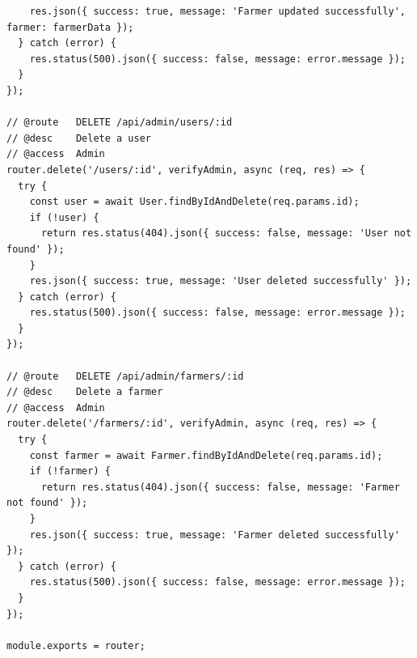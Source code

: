 \documentclass[12pt,a4paper]{report}
\begin{document}
\begin{lstlisting}
    res.json({ success: true, message: 'Farmer updated successfully', farmer: farmerData });
  } catch (error) {
    res.status(500).json({ success: false, message: error.message });
  }
});

// @route   DELETE /api/admin/users/:id
// @desc    Delete a user
// @access  Admin
router.delete('/users/:id', verifyAdmin, async (req, res) => {
  try {
    const user = await User.findByIdAndDelete(req.params.id);
    if (!user) {
      return res.status(404).json({ success: false, message: 'User not found' });
    }
    res.json({ success: true, message: 'User deleted successfully' });
  } catch (error) {
    res.status(500).json({ success: false, message: error.message });
  }
});

// @route   DELETE /api/admin/farmers/:id
// @desc    Delete a farmer
// @access  Admin
router.delete('/farmers/:id', verifyAdmin, async (req, res) => {
  try {
    const farmer = await Farmer.findByIdAndDelete(req.params.id);
    if (!farmer) {
      return res.status(404).json({ success: false, message: 'Farmer not found' });
    }
    res.json({ success: true, message: 'Farmer deleted successfully' });
  } catch (error) {
    res.status(500).json({ success: false, message: error.message });
  }
});

module.exports = router;

\end{lstlisting}

\clearpage
\end{document}
